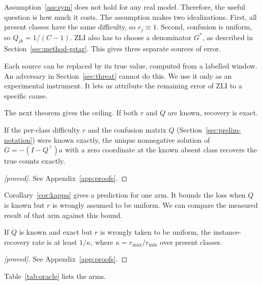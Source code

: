 Assumption~\ref{ass:sym} does not hold for any real model. Therefore, the
useful question is how much it costs. The assumption makes two
idealizations. First, all present classes have the same difficulty, so
\(r_j \equiv 1\). Second, confusion is uniform, so
\(Q_{jk} = 1/(C-1)\). ZLI also has to choose a denominator \(G^*\), as
described in Section~\ref{sec:method-gstar}. This gives three separate
sources of error.

Each source can be replaced by its true value, computed from a labelled
window. An adversary in Section~\ref{sec:threat} cannot do this. We use it
only as an experimental instrument. It lets us attribute the remaining
error of ZLI to a specific cause.

The next theorem gives the ceiling. If both \(r\) and \(Q\) are known,
recovery is exact.

\begin{theorem}
\label{thm:general}
If the per-class difficulty \(r\) and the confusion matrix \(Q\)
(Section~\ref{sec:prelim-notation}) were known exactly, the unique
nonnegative solution of \(G=-(I-Q^{\top})a\) with a zero coordinate at
the known absent class recovers the true counts exactly.
\end{theorem}

\begin{proof}[\textnormal{[proved]}]
See Appendix~\ref{app:proofs}.
\end{proof}

Corollary~\ref{cor:kappa} gives a prediction for one arm. It bounds the
loss when \(Q\) is known but \(r\) is wrongly assumed to be uniform. We
can compare the measured result of that arm against this bound.

\begin{corollary}
\label{cor:kappa}
If \(Q\) is known and exact but \(r\) is wrongly taken to be uniform, the
instance-recovery rate is at least \(1/\kappa\), where
\(\kappa=r_{\max}/r_{\min}\) over present classes.
\end{corollary}

\begin{proof}[\textnormal{[proved]}]
See Appendix~\ref{app:proofs}.
\end{proof}

Table~\ref{tab:oracle} lists the arms.

